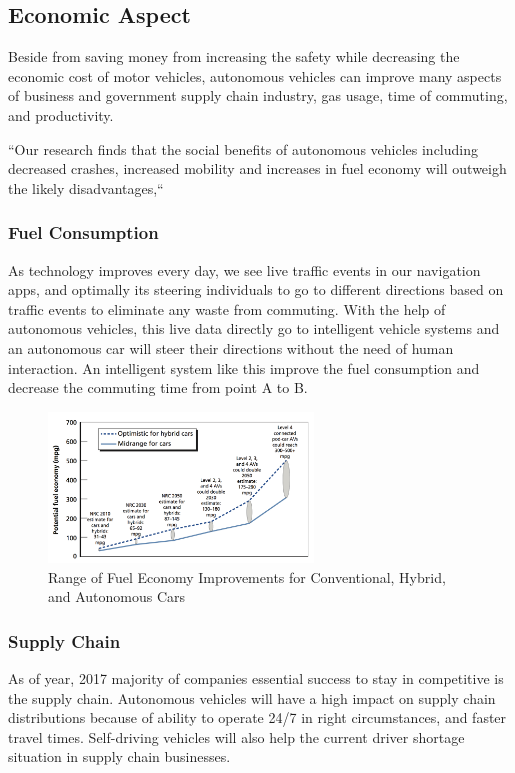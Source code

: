 \documentclass{acm_proc_article-sp}
\begin{document}
\subsection{Economic Aspect}
Beside from saving money from increasing the safety while decreasing the economic cost of motor vehicles, autonomous vehicles can improve many aspects of business and government supply chain industry, gas usage, time of commuting, and productivity.
\begin{center}
``Our research finds that the social benefits of autonomous vehicles including decreased crashes, increased mobility and increases in fuel economy will outweigh the likely disadvantages,``\cite{RAND}
\end{center}
\subsubsection{Fuel Consumption}As technology improves every day, we see live traffic events in our navigation apps, and optimally its steering individuals to go to different directions based on traffic events to eliminate any waste from commuting. With the help of autonomous vehicles, this live data directly go to intelligent vehicle systems and an autonomous car will steer their directions without the need of human interaction. An intelligent system like this improve the fuel consumption and decrease the commuting time from point A to B.

\begin{figure}[!ht]
  \centering
      \includegraphics[width=1.0\columnwidth, height = 4.0cm]{images/picture7.png}
  \caption{Range of Fuel Economy Improvements for Conventional, Hybrid, and Autonomous Cars}\label{F:fuelconsumption}
\end{figure}

\subsubsection{Supply Chain} As of year, 2017 majority of companies essential success to stay in competitive is the supply chain.  Autonomous vehicles will have a high impact on supply chain distributions because of ability to operate 24/7 in right circumstances, and faster travel times. Self-driving vehicles will also help the current driver shortage situation in supply chain businesses.
\end{document}
